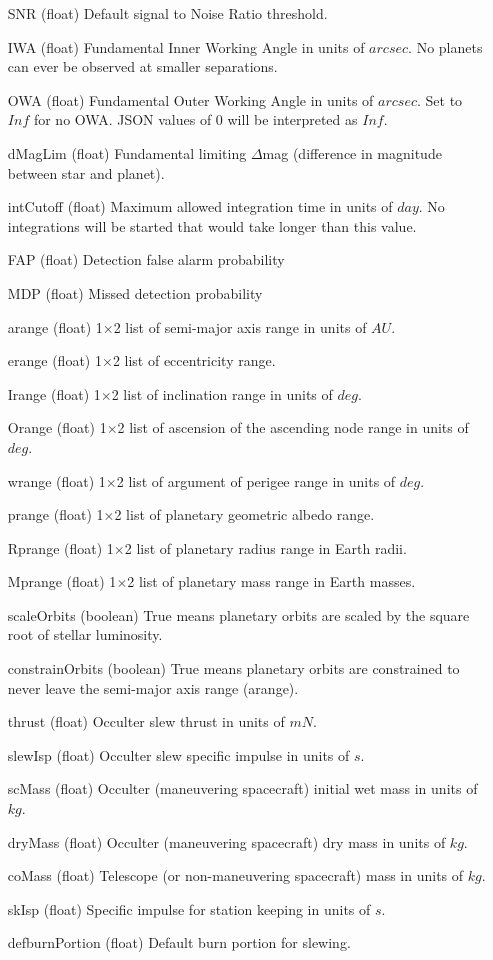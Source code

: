\documentclass[cleanfoot]{asme2ej}
\begin{document}
\begin{itemize}[leftmargin=1.5in,font={\ttfamily}]
\item[SNR] (float) Default signal to Noise Ratio threshold.
\item[IWA] (float) Fundamental Inner Working Angle in units of $ arcsec $. No planets can ever be observed at smaller separations.
\item[OWA] (float) Fundamental Outer Working Angle in units of $ arcsec $. Set to $ Inf $ for no OWA. JSON values of 0 will be interpreted as $ Inf $.
\item[dMagLim] (float) Fundamental limiting $\Delta$mag (difference in magnitude between star and planet). 
\item[intCutoff] (float)  Maximum allowed integration time in units of $ day $. No integrations will be started that would take longer than this value.
\item[FAP] (float) Detection false alarm probability
\item[MDP] (float) Missed detection probability
\item[arange] (float) 1$\times$2 list of semi-major axis range in units of $ AU $. 
\item[erange] (float) 1$\times$2 list of eccentricity range.
\item[Irange] (float) 1$\times$2 list of inclination range in units of $ deg $.  
\item[Orange] (float) 1$\times$2 list of ascension of the ascending node range in units of $ deg $.  
\item[wrange] (float) 1$\times$2 list of argument of perigee range in units of $ deg $. 
\item[prange] (float) 1$\times$2 list of planetary geometric albedo range.  
\item[Rprange] (float) 1$\times$2 list of planetary radius range in Earth radii.  
\item[Mprange] (float) 1$\times$2 list of planetary mass range in Earth masses.  
\item [scaleOrbits] (boolean) True means planetary orbits are scaled by the square root of stellar luminosity. 
\item[constrainOrbits] (boolean) True means planetary orbits are constrained to never leave the semi-major axis range (arange).
\item[thrust] (float) Occulter slew thrust in units of $ mN $.
\item[slewIsp] (float) Occulter slew specific impulse in units of $ s $.
\item[scMass] (float) Occulter (maneuvering spacecraft) initial wet mass in units of $ kg $. 
\item[dryMass] (float) Occulter (maneuvering spacecraft) dry mass in units of $ kg $. 
\item[coMass] (float) Telescope (or non-maneuvering spacecraft) mass in units of $ kg $. 
\item[skIsp] (float) Specific impulse for station keeping in units of $ s $. 
\item[defburnPortion] (float) Default burn portion for slewing.
\end{itemize}
\end{document}
